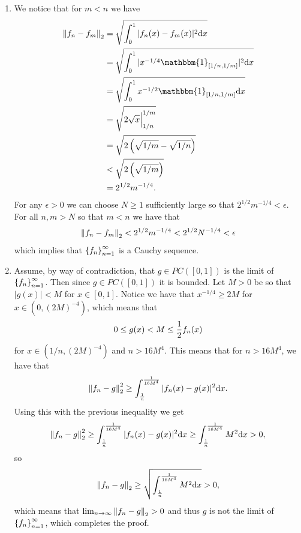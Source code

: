 \documentclass[11pt,a4paper]{article}
\begin{document}
\begin{solution} \phantom{}
  \begin{enumerate}
    \item[(1)] We notice that for $m < n$ we have
      \begin{align*}
        \norm{f_n - f_m}_2 &=
        \sqrt{\int_{0}^{1} |f_n(x) - f_m(x)|^2 \dx} \\ &=
        \sqrt{\int_{0}^{1} |x^{-1/4} \mathbbm{1}_{[1/n,1/m]}|^2 \dx} \\ &=
        \sqrt{\int_{0}^{1} x^{-1/2} \mathbbm{1}_{[1/n,1/m]} \dx} \\ &=
        \sqrt{2\sqrt{x} \Big\vert^{1/m}_{1/n}} \\ &=
        \sqrt{2 \left(\sqrt{1/m} - \sqrt{1/n}\right)} \\ &<
        \sqrt{2 \left(\sqrt{1/m}\right)} \\ &=
        2^{1/2} m^{-1/4}.
      \end{align*}
      For any $\epsilon > 0$ we can choose $N \geq 1$ sufficiently large
      so that $2^{1/2} m^{-1/4} < \epsilon$.
      For all $n,m > N$ so that $m < n$ we have that
      \[
        \left\lVert f_n - f_m\right\rVert_2 < 
        2^{1/2} m^{-1/4} <
        2^{1/2} N^{-1/4} < \epsilon
      \]
      which implies that $\left\{f_n\right\}_{n=1}^{\infty}$ is a Cauchy sequence.
    \item[(2)] Assume, by way of contradiction, that $g \in PC([0,1])$
      is the limit of $\left\{f_n\right\}_{n=1}^{\infty}$.
      Then since $g \in PC([0,1])$ it is bounded.
      Let $M > 0$ be so that $|g(x)| < M$ for $x \in [0,1]$.
      Notice we have that $x^{-1/4} \geq 2M$ for $x \in (0,(2M)^{-4})$,
      which means that
      \[
        0 \le g(x) < M \le \frac{1}{2} f_n(x)
      \]
      for $x \in (1/n,(2M)^{-4})$ and $n > 16M^4$.
      This means that for $n > 16M^4$, we have that
      \[
        \norm{f_n - g}_2^2 \geq
        \int_{\frac{1}{n}}^{\frac{1}{16M^4}} |f_n(x) - g(x)|^2 \dx.
      \]
      Using this with the previous inequality we get
      \[
        \norm{f_n - g}_2^2 \geq
        \int_{\frac{1}{n}}^{\frac{1}{16M^4}} |f_n(x) - g(x)|^2 \dx \geq
        \int_{\frac{1}{n}}^{\frac{1}{16M^4}} M^2 \dx > 0,
      \]
      so
      \[
        \norm{f_n - g}_2 \geq
        \sqrt{\int_{\frac{1}{n}}^{\frac{1}{16M^4}} M^2 \dx} > 0,
      \]
      which means that $\lim_{n \to \infty} \left\lVert f_n - g\right\rVert_2 > 0$ and thus
      $g$ is not the limit of $\left\{f_n\right\}_{n=1}^{\infty}$, which completes the
      proof.
  \end{enumerate}
\end{solution}
\end{document}
